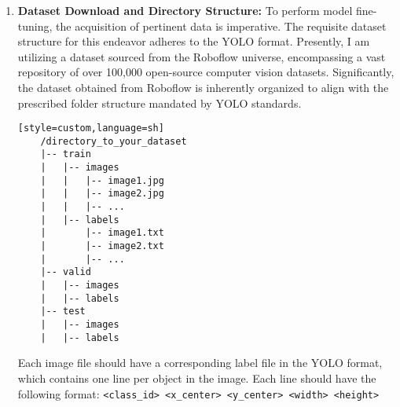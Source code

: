 \begin{enumerate}
\begin{lstlisting}[language=Python, caption=importing models from the supergradients][H]
    model = models.get(yolo_nas_l, pretrained_weights="coco").to(DEVICE)
    \end{lstlisting}
    \item \textbf{Dataset Download and Directory Structure: }
   To perform model fine-tuning, the acquisition of pertinent data is imperative. The requisite dataset structure for this endeavor adheres to the YOLO format. Presently, I am utilizing a dataset sourced from the Roboflow universe, encompassing a vast repository of over 100,000 open-source computer vision datasets. Significantly, the dataset obtained from Roboflow is inherently organized to align with the prescribed folder structure mandated by YOLO standards.

    \begin{lstlisting}[caption=Dataset folder structure YOLO format][style=custom,language=sh]
    /directory_to_your_dataset
    |-- train
    |   |-- images
    |   |   |-- image1.jpg
    |   |   |-- image2.jpg
    |   |   |-- ...
    |   |-- labels
    |       |-- image1.txt
    |       |-- image2.txt
    |       |-- ...
    |-- valid
    |   |-- images
    |   |-- labels
    |-- test
    |   |-- images
    |   |-- labels
    \end{lstlisting}
    Each image file should have a corresponding label file in the YOLO format, which contains one line per object in the image. Each line should have the following format:
    \texttt{<class\_id> <x\_center> <y\_center> <width> <height>}
    

\end{enumerate}
